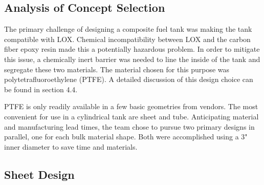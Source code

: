  
\subsection{Analysis of Concept Selection}


The primary challenge of designing a composite fuel tank was making the tank compatible with LOX. Chemical incompatibility between LOX and the carbon fiber epoxy resin made this a potentially hazardous problem. In order to mitigate this issue, a chemically inert barrier was needed to line the inside of the tank and segregate these two materials. The material chosen for this purpose was polytetrafluoroethylene (PTFE). A detailed discussion of this design choice can be found in section 4.4.

PTFE is only readily available in a few basic geometries from vendors. The most convenient for use in a cylindrical tank are sheet and tube. Anticipating material and manufacturing lead times, the team chose to pursue two primary designs in parallel, one for each bulk material shape. Both were accomplished using a 3" inner diameter to save time and materials.   

\subsection{Sheet Design}


